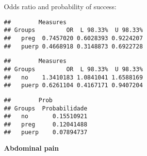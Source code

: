 \documentclass[
]{article}
\newenvironment{Shaded}{\begin{snugshade}}{\end{snugshade}}
\newcommand{\CommentTok}[1]{\textcolor[rgb]{0.56,0.35,0.01}{\textit{#1}}}
\newcommand{\KeywordTok}[1]{\textcolor[rgb]{0.13,0.29,0.53}{\textbf{#1}}}
\newcommand{\NormalTok}[1]{#1}
\newcommand{\OperatorTok}[1]{\textcolor[rgb]{0.81,0.36,0.00}{\textbf{#1}}}
\begin{document}
Odds ratio and probability of success:

\begin{Shaded}
\end{Shaded}

\begin{verbatim}
##        Measures
## Groups         OR  L 98.33%  U 98.33%
##   preg  0.7457020 0.6028393 0.9224207
##   puerp 0.4668918 0.3148873 0.6922728
\end{verbatim}

\begin{Shaded}
\end{Shaded}

\begin{verbatim}
##        Measures
## Groups         OR  L 98.33%  U 98.33%
##   no    1.3410183 1.0841041 1.6588169
##   puerp 0.6261104 0.4167171 0.9407204
\end{verbatim}

\begin{Shaded}
\end{Shaded}

\begin{verbatim}
##        Prob
## Groups  Probabilidade
##   no       0.15510921
##   preg     0.12041488
##   puerp    0.07894737
\end{verbatim}

\textbf{Abdominal pain}
\end{document}
